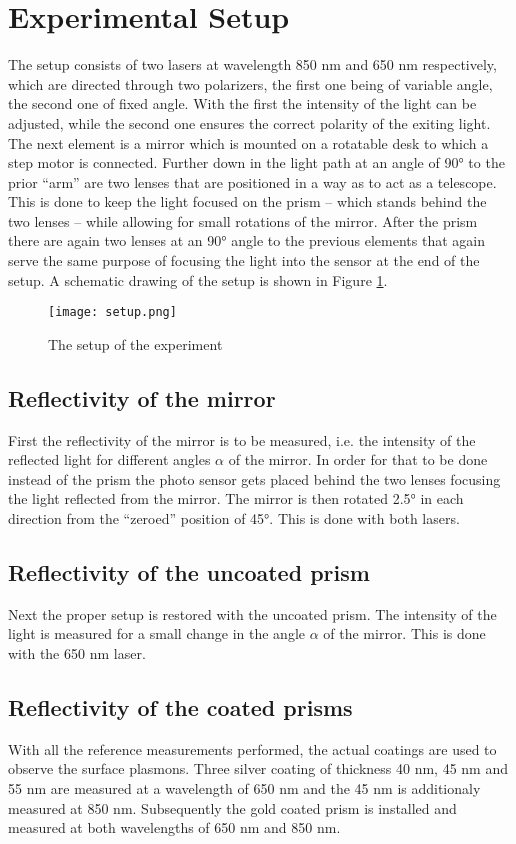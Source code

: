 \documentclass[twoside,english,headsepline=on,DIV=12]{scrartcl}
\numberwithin{equation}{section}
\begin{document}
\section{Experimental Setup}
The setup consists of two lasers at wavelength 850 nm and 650 nm respectively, which are directed through two polarizers, the first one being of variable angle, the second one of fixed angle. With the first the intensity of the light can be adjusted, while the second one ensures the correct polarity of the exiting light. The next element is a mirror which is mounted on a rotatable desk to which a step motor is connected. Further down in the light path at an angle of 90° to the prior ``arm'' are two lenses that are positioned in a way as to act as a telescope. This is done to keep the light focused on the prism -- which stands behind the two lenses -- while allowing for small rotations of the mirror. After the prism there are again two lenses at an 90° angle to the previous elements that again serve the same purpose of focusing the light into the sensor at the end of the setup. 
A schematic drawing of the setup is shown in Figure \ref{fig:setup}.
\begin{figure}
	\centering
	\texttt{[image: setup.png]}
	\caption{The setup of the experiment\cite{anleitung}}
	\label{fig:setup}
\end{figure}
\subsection{Reflectivity of the mirror}
First the reflectivity of the mirror is to be measured, i.e. the intensity of the reflected light for different angles $\alpha$ of the mirror. In order for that to be done instead of the prism the photo sensor gets placed behind the two lenses focusing the light reflected from the mirror. The mirror is then rotated 2.5° in each direction from the ``zeroed'' position of 45°. This is done with both lasers. 
\subsection{Reflectivity of the uncoated prism}
Next the proper setup is restored with the uncoated prism. The intensity of the light is measured for a small change in the angle $\alpha$ of the mirror. This is done with the 650 nm laser.
\subsection{Reflectivity of the coated prisms}
With all the reference measurements performed, the actual coatings are used to observe the surface plasmons. Three silver coating of thickness 40 nm, 45 nm and 55 nm are measured at a wavelength of 650 nm and the 45 nm is additionaly measured at 850 nm. Subsequently the gold coated prism is installed and measured at both wavelengths of 650 nm and 850 nm. 
\end{document}
